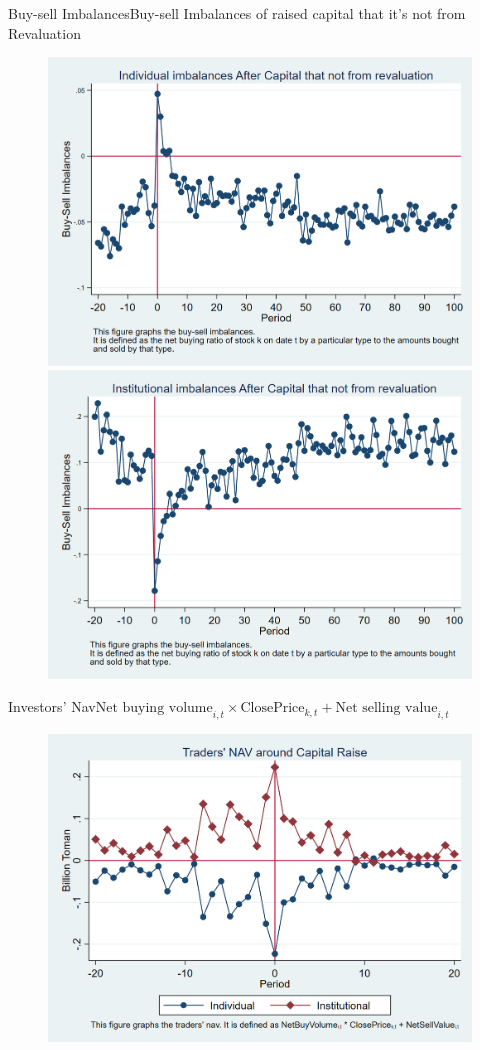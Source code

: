\documentclass{beamer}
\begin{document}
\begin{frame}{Buy-sell Imbalances}{Buy-sell Imbalances of raised capital that it's not from Revaluation}
\begin{figure}
\centering
\includegraphics[width=0.45\linewidth]{Output/IndImb_NoRevaluation.png}
\includegraphics[width=0.45\linewidth]{Output/InsImb_NoRevaluation.png}
\label{fig:indimbnorevaluation}
\end{figure}
\end{frame}

\begin{frame}{Investors' Nav}{$ \text{Net buying volume}_{i,t} \times \text{ClosePrice}_{k,t} + \text{Net selling value}_{i,t} $}
	\begin{figure}
		\centering
		\includegraphics[width=0.65\linewidth]{Output/IndInsNav.png}
		\label{fig:IndInsNav}
	\end{figure}
\end{frame}
\end{document}
